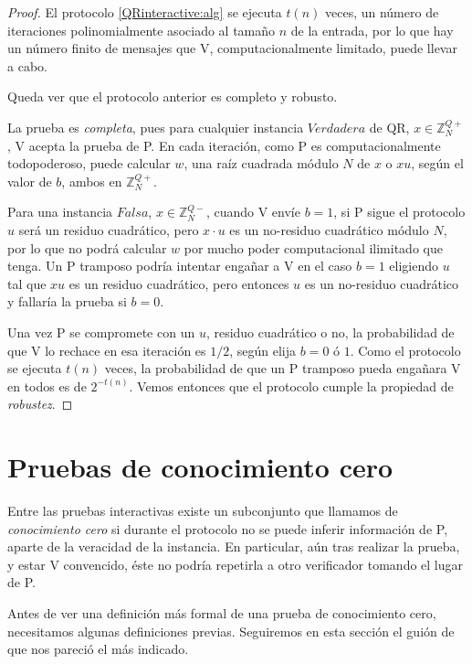 \begin{proof}
	
	El protocolo \ref{QRinteractive:alg} se ejecuta $t(n)$ veces, un número de iteraciones polinomialmente asociado al tamaño $n$ de la entrada, por lo que hay un número finito de mensajes que V, computacionalmente limitado, puede llevar a cabo. 
		
	Queda ver que el protocolo anterior es completo y robusto.
	
	La prueba es \textit{completa}, pues para cualquier instancia $Verdadera$ de QR, $x \in \mathbb{Z}^{Q+}_N$, V acepta la prueba de P. En cada iteración, como P es computacionalmente todopoderoso, puede calcular $w$, una raíz cuadrada módulo $N$ de $x$ o $xu$, según el valor de $b$, ambos en $\mathbb{Z}^{Q+}_N$.
	
	Para una instancia $Falsa$, $x \in \mathbb{Z}^{Q-}_N$, cuando V envíe $b=1$, si P sigue el protocolo $u$ será un residuo cuadrático, pero $x\cdot u$ es un no-residuo cuadrático módulo $N$, por lo que no podrá calcular $w$ por mucho poder computacional ilimitado que tenga. Un P tramposo podría intentar engañar a V en el caso $b = 1$ eligiendo $u$ tal que $xu$ es un residuo cuadrático, pero entonces $u$ es un no-residuo cuadrático y fallaría la prueba si $b=0$.
	
	Una vez P se compromete con un $u$, residuo cuadrático o no, la probabilidad de que V lo rechace en esa iteración es $1/2$, según elija $b=0$ ó $1$. Como el protocolo se ejecuta $t(n)$ veces, la probabilidad de que un P tramposo pueda engañara V en todos es de $2^{-t(n)}$. Vemos entonces que el protocolo cumple la propiedad de \textit{robustez}.
\end{proof}


\section{Pruebas de conocimiento cero}

Entre las pruebas interactivas existe un subconjunto que llamamos de \textit{conocimiento cero} si durante el protocolo no se puede inferir información de P, aparte de la veracidad de la instancia. En particular, aún tras realizar la prueba, y estar V convencido, éste no podría repetirla a otro verificador tomando el lugar de P.

\hfil

Antes de ver una definición más formal de una prueba de conocimiento cero, necesitamos algunas definiciones previas. Seguiremos en esta sección el guión de \citep{pieprzyk2013fundamentals} que nos pareció el más indicado.



